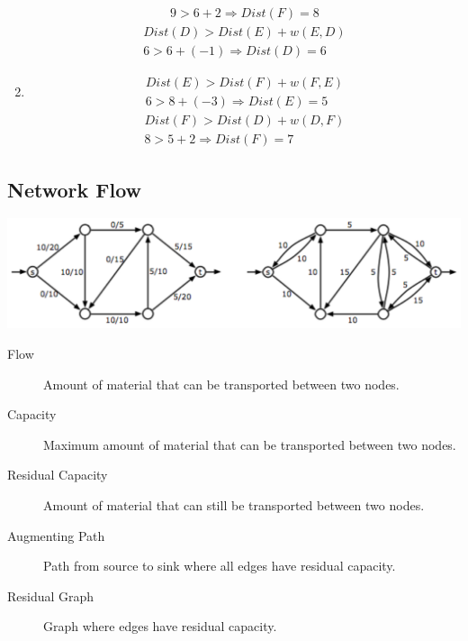 \documentclass{article}
\begin{document}
\begin{multicols*}{2}
\begin{enumerate}[label=Relaxation \arabic*:]
\begin{align*}
                  9 > 6 + 2 \Rightarrow Dist(F) = 8
              \end{align*}
              \begin{align*}
                  Dist(D) > Dist(E) + w(E, D) \\
                  6 > 6 + (-1) \Rightarrow Dist(D) = 6
              \end{align*}
        \item \begin{align*} Dist(E) > Dist(F) + w(F, E) \\
                  6 > 8 + (-3) \Rightarrow Dist(E) = 5
              \end{align*}
              \begin{align*}
                  Dist(F) > Dist(D) + w(D, F) \\
                  8 > 5 + 2 \Rightarrow Dist(F) = 7
              \end{align*}
    \end{enumerate}
    \small
    \subsection*{Network Flow}
    \includegraphics[width=\linewidth]{residual.png}
    \begin{description}
        \item[Flow] Amount of material that can be transported between two
            nodes.
        \item[Capacity] Maximum amount of material that can be transported
            between two nodes.
        \item[Residual Capacity] Amount of material that can still be
            transported between two nodes.
        \item[Augmenting Path] Path from source to sink where all edges have
            residual capacity.
        \item[Residual Graph] Graph where edges have residual capacity.
    \end{description}


\end{multicols*}
\end{document}
